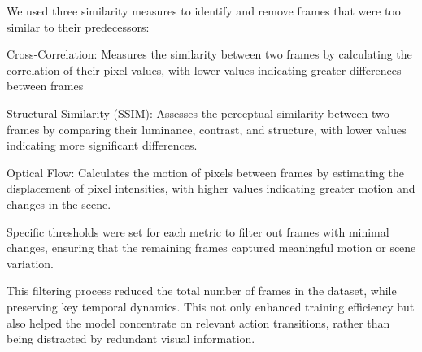 \documentclass[conference]{IEEEtran}
\begin{document}
We used three similarity measures to identify and remove frames that were too similar to their predecessors:  

Cross-Correlation: Measures the similarity between two frames by calculating the correlation of their pixel values, with lower values indicating greater differences between frames 

Structural Similarity (SSIM): Assesses the perceptual similarity between two frames by comparing their luminance, contrast, and structure, with lower values indicating more significant differences. 

Optical Flow: Calculates the motion of pixels between frames by estimating the displacement of pixel intensities, with higher values indicating greater motion and changes in the scene. 

Specific thresholds were set for each metric to filter out frames with minimal changes, ensuring that the remaining frames captured meaningful motion or scene variation. 

This filtering process reduced the total number of frames in the dataset, while preserving key temporal dynamics. This not only enhanced training efficiency but also helped the model concentrate on relevant action transitions, rather than being distracted by redundant visual information. 
\end{document}

